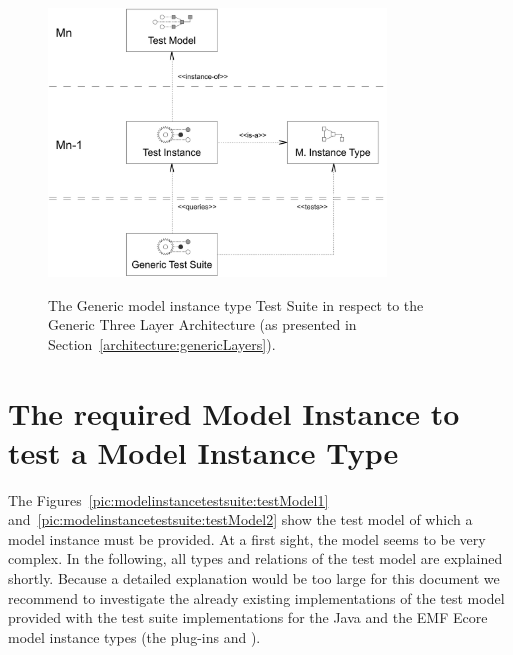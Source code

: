 \begin{figure}[!t]
	\centering
		\includegraphics[width=0.80\textwidth]{figures/modelinstancetestsuite/genericTestSuite.pdf}
	\label{pic:modelinstancetestsuite:genericTestSuite}
	\caption{The Generic model instance type Test Suite in respect to the Generic
	Three Layer Ar\-chi\-tec\-ture (as presented in Section~\ref{architecture:genericLayers}).}
\end{figure}



\section{The required Model Instance to test a Model Instance Type}

The Figures~\ref{pic:modelinstancetestsuite:testModel1} 
and~\ref{pic:modelinstancetestsuite:testModel2} show the test model of which a
model instance must be provided. At a first sight, the model seems to be very 
complex. In the following, all types and relations of the test model are
explained shortly. Because a detailed explanation would be too large for this
document we recommend to investigate the already existing implementations of 
the test model provided with the test suite implementations for the Java and 
the \acs{EMF} Ecore model instance types (the plug-ins
 and 
).

